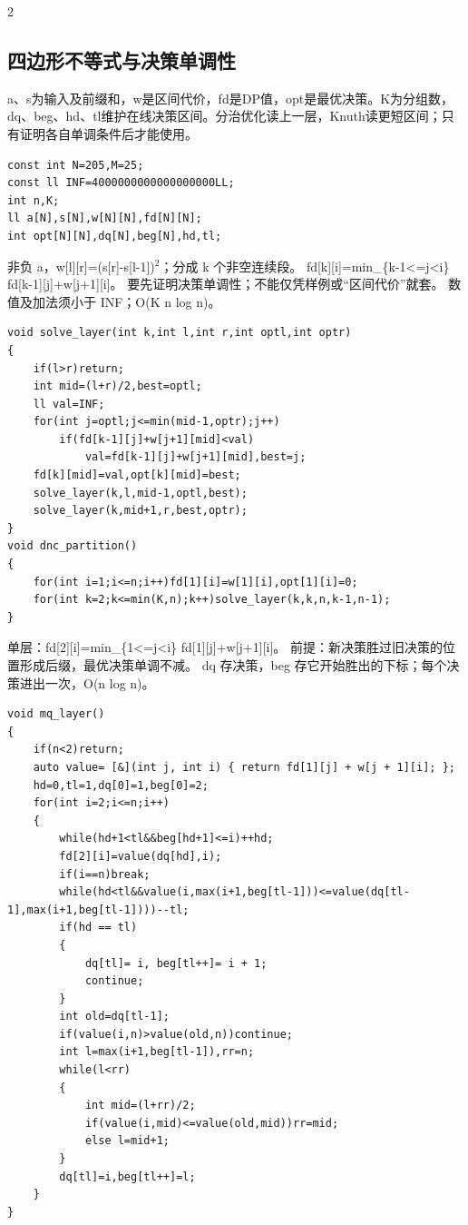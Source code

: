 \documentclass[UTF8,fontset=fandol,a4paper,twoside]{ctexart}
\newcommand{\note}[1]{{\fontsize{10}{12}\selectfont #1\par}}
\begin{document}
\begin{multicols}{2}
\subsection{四边形不等式与决策单调性}

\note{a、s为输入及前缀和，w是区间代价，fd是DP值，opt是最优决策。K为分组数，dq、beg、hd、tl维护在线决策区间。分治优化读上一层，Knuth读更短区间；只有证明各自单调条件后才能使用。}
\begin{lstlisting}
const int N=205,M=25;
const ll INF=4000000000000000000LL;
int n,K;
ll a[N],s[N],w[N][N],fd[N][N];
int opt[N][N],dq[N],beg[N],hd,tl;
\end{lstlisting}
\note{非负 a，w[\allowbreak{}l]\allowbreak{}[\allowbreak{}r]\allowbreak{}=\allowbreak{}(\allowbreak{}s[\allowbreak{}r]\allowbreak{}-\allowbreak{}s[\allowbreak{}l-\allowbreak{}1]\allowbreak{})\allowbreak{}\ensuremath{^2}；分成 k 个非空连续段。 fd[\allowbreak{}k]\allowbreak{}[\allowbreak{}i]\allowbreak{}=\allowbreak{}min\_\{k-\allowbreak{}1<\allowbreak{}=\allowbreak{}j<\allowbreak{}i\} fd[\allowbreak{}k-\allowbreak{}1]\allowbreak{}[\allowbreak{}j]\allowbreak{}+\allowbreak{}w[\allowbreak{}j+\allowbreak{}1]\allowbreak{}[\allowbreak{}i]\allowbreak{}。 要先证明决策单调性；不能仅凭样例或“区间代价”就套。 数值及加法须小于 INF；O(\allowbreak{}K n log n)\allowbreak{}。}
\begin{lstlisting}
void solve_layer(int k,int l,int r,int optl,int optr)
{
    if(l>r)return;
    int mid=(l+r)/2,best=optl;
    ll val=INF;
    for(int j=optl;j<=min(mid-1,optr);j++)
        if(fd[k-1][j]+w[j+1][mid]<val)
            val=fd[k-1][j]+w[j+1][mid],best=j;
    fd[k][mid]=val,opt[k][mid]=best;
    solve_layer(k,l,mid-1,optl,best);
    solve_layer(k,mid+1,r,best,optr);
}
void dnc_partition()
{
    for(int i=1;i<=n;i++)fd[1][i]=w[1][i],opt[1][i]=0;
    for(int k=2;k<=min(K,n);k++)solve_layer(k,k,n,k-1,n-1);
}
\end{lstlisting}
\note{单层：fd[\allowbreak{}2]\allowbreak{}[\allowbreak{}i]\allowbreak{}=\allowbreak{}min\_\{1<\allowbreak{}=\allowbreak{}j<\allowbreak{}i\} fd[\allowbreak{}1]\allowbreak{}[\allowbreak{}j]\allowbreak{}+\allowbreak{}w[\allowbreak{}j+\allowbreak{}1]\allowbreak{}[\allowbreak{}i]\allowbreak{}。 前提：新决策胜过旧决策的位置形成后缀，最优决策单调不减。 dq 存决策，beg 存它开始胜出的下标；每个决策进出一次，O(\allowbreak{}n log n)\allowbreak{}。}
\begin{lstlisting}
void mq_layer()
{
    if(n<2)return;
    auto value= [&](int j, int i) { return fd[1][j] + w[j + 1][i]; };
    hd=0,tl=1,dq[0]=1,beg[0]=2;
    for(int i=2;i<=n;i++)
    {
        while(hd+1<tl&&beg[hd+1]<=i)++hd;
        fd[2][i]=value(dq[hd],i);
        if(i==n)break;
        while(hd<tl&&value(i,max(i+1,beg[tl-1]))<=value(dq[tl-1],max(i+1,beg[tl-1])))--tl;
        if(hd == tl)
        {
            dq[tl]= i, beg[tl++]= i + 1;
            continue;
        }
        int old=dq[tl-1];
        if(value(i,n)>value(old,n))continue;
        int l=max(i+1,beg[tl-1]),rr=n;
        while(l<rr)
        {
            int mid=(l+rr)/2;
            if(value(i,mid)<=value(old,mid))rr=mid;
            else l=mid+1;
        }
        dq[tl]=i,beg[tl++]=l;
    }
}
\end{lstlisting}

\end{multicols}
\end{document}
